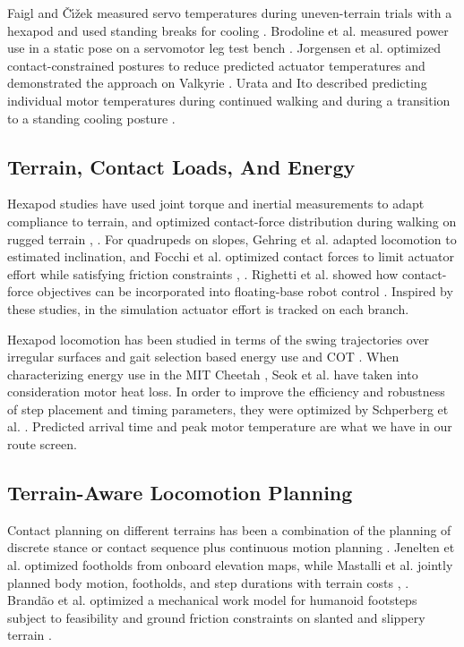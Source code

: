 \documentclass{ieeeaccess}
\begin{document}
Faigl and \v{C}\'{\i}\v{z}ek measured servo temperatures during uneven-terrain trials with a hexapod and used standing breaks for cooling \cite{faigl2019}. Brodoline et al. measured power use in a static pose on a servomotor leg test bench \cite{brodoline2024}. Jorgensen et al. optimized contact-constrained postures to reduce predicted actuator temperatures and demonstrated the approach on Valkyrie \cite{jorgensen2019}. Urata and Ito described predicting individual motor temperatures during continued walking and during a transition to a standing cooling posture \cite{urata2017}.

\subsection{Terrain, Contact Loads, And Energy}

Hexapod studies have used joint torque and inertial measurements to adapt compliance to terrain, and optimized contact-force distribution during walking on rugged terrain \cite{zhao2021}, \cite{ding2024}. For quadrupeds on slopes, Gehring et al. adapted locomotion to estimated inclination, and Focchi et al. optimized contact forces to limit actuator effort while satisfying friction constraints \cite{gehring2015}, \cite{focchi2017}. Righetti et al. showed how contact-force objectives can be incorporated into floating-base robot control \cite{righetti2013}. Inspired by these studies, in the simulation actuator effort is tracked on each branch.

Hexapod locomotion has been studied in terms of the swing trajectories over irregular surfaces \cite{luneckas2019} and gait selection based energy use and COT \cite{luneckas2021}. When characterizing energy use in the MIT Cheetah \cite{seok2015}, Seok et al. have taken into consideration motor heat loss. In order to improve the efficiency and robustness of step placement and timing parameters, they were optimized by Schperberg et al. \cite{schperberg2025}. Predicted arrival time and peak motor temperature are what we have in our route screen.

\subsection{Terrain-Aware Locomotion Planning}

Contact planning on different terrains has been a combination of the planning of discrete stance or contact sequence plus continuous motion planning \cite{hauser2008} \cite{valouch2021}. Jenelten et al. optimized footholds from onboard elevation maps, while Mastalli et al. jointly planned body motion, footholds, and step durations with terrain costs \cite{jenelten2020}, \cite{mastalli2020}. Brandão et al. optimized a mechanical work model for humanoid footsteps subject to feasibility and ground friction constraints on slanted and slippery terrain \cite{brandao2016}.
\end{document}
